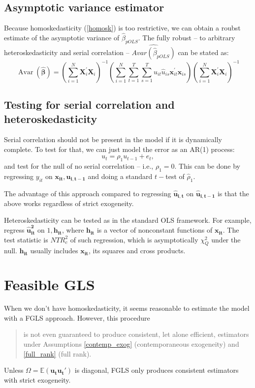\documentclass[11pt, a4paper]{report}
\theoremstyle{plain}
\theoremstyle{plain}
\theoremstyle{remark}
\begin{document}
\subsection{Asymptotic variance estimator}

Because homoskedasticity (\ref{homosk}) is too restrictive, we can obtain a roubst estimate of the asymptotic variance of $\hat{\beta}_{pOLS}.$ The fully robust -- to arbitrary heteroskedasticity and serial correlation -- $\widehat{Avar(\hat{\beta}_{pOLS})}$ can be stated as: 
\begin{equation}
    \operatorname{Avar}(\hat{\boldsymbol{\beta}})=\left(\sum_{i=1}^{N} \mathbf{X}_{i}^{\prime} \mathbf{X}_{i}\right)^{-1}\left(\sum_{i=1}^{N} \sum_{t=1}^{T} \sum_{s=1}^{T} \hat{u}_{i t} \hat{u}_{i s} \mathbf{x}_{i t}^{\prime} \mathbf{x}_{i s}\right)\left(\sum_{i=1}^{N} \mathbf{X}_{i}^{\prime} \mathbf{X}_{i}\right)^{-1}
\end{equation}

\subsection{Testing for serial correlation and heteroskedasticity}

Serial correlation should not be present in the model if it is dynamically complete. To test for that, we can just model the error as an AR(1) process:
$$ u_t = \rho_1 u_{t-1} + e_t, $$
and test for the null of no serial correlation -- i.e., $\rho_1 = 0$. This can be done by regressing $y_{it}$ on $\mathbf{x_{it}, \hat{u}_{i,t-1}}$ and doing a standard $t-$test of $\hat{\rho}_1$. 

The advantage of this approach compared to regressing $\mathbf{\hat{u}_{i,t}}$ on $\mathbf{\hat{u}_{i,t-1}}$ is that the above works regardless of strict exogeneity. 

Heteroskedasticity can be tested as in the standard OLS framework. For example, regress $\mathbf{\hat{u}_{it}^2}$ on $1, \mathbf{h_{it}}$, where $\mathbf{h_{it}}$ is a vector of nonconstant functions of $\mathbf{x_{it}}$. The test statistic is $NTR_c^2$ of such regression, which is asymptotically $\chi_Q^2$ under the null. $\mathbf{h_{it}}$ usually includes $\mathbf{x_{it}}$, its squares and cross products.

\section{Feasible GLS}

When we don't have homoskedasticity, it seems reasonable to estimate the model with a FGLS approach. However, this procedure
\begin{quote}
    is not even guaranteed to produce consistent, let alone efficient, estimators under Assumptions \ref{contemp_exog} (contemporaneous exogeneity) and \ref{full_rank} (full rank).
\end{quote}
Unless $\Omega = \mathbb{E}(\mathbf{u_tu_t'})$ is diagonal, FGLS only produces consistent estimators with strict exogeneity. 
\end{document}
